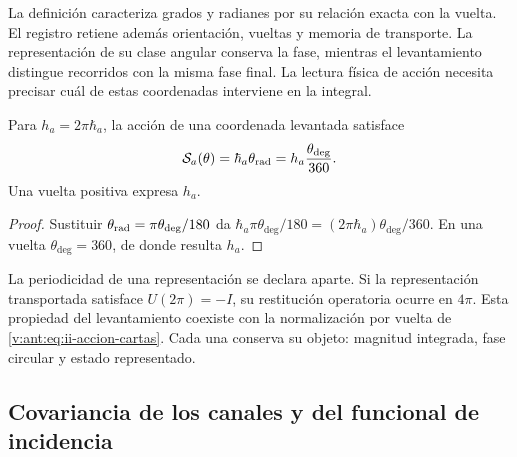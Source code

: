 La definición caracteriza grados y radianes por su relación exacta
con la vuelta. El registro retiene además orientación, vueltas y
memoria de transporte. La representación de su clase angular conserva
la fase, mientras el levantamiento distingue recorridos con la misma
fase final. La lectura física de acción necesita precisar cuál de
estas coordenadas interviene en la integral.

\begin{proposition}
Para \(h_a=2\pi\hbar_a\), la acción de una coordenada levantada
satisface
\begin{equation}
 \mathcal S_a(\theta)
 =\hbar_a\theta_{\rm rad}
 =h_a\frac{\theta_{\deg}}{360}.
 \label{v:ant:eq:ii-accion-cartas}
\end{equation}
Una vuelta positiva expresa \(h_a\).
\end{proposition}
\begin{proof}
Sustituir \(\theta_{\rm rad}=\pi\theta_{\deg}/180\) da
\(\hbar_a\pi\theta_{\deg}/180
=(2\pi\hbar_a)\theta_{\deg}/360\). En una vuelta
\(\theta_{\deg}=360\), de donde resulta \(h_a\).
\end{proof}

La periodicidad de una representación se declara aparte. Si la
representación transportada satisface \(U(2\pi)=-I\), su restitución
operatoria ocurre en \(4\pi\). Esta propiedad del levantamiento
coexiste con la normalización por vuelta de
\eqref{v:ant:eq:ii-accion-cartas}. Cada una conserva su objeto: magnitud
integrada, fase circular y estado representado.

\subsection{Covariancia de los canales y del funcional de incidencia}


